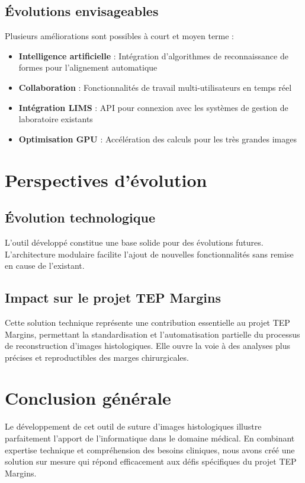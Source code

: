 \documentclass[11pt,a4paper]{report}
\begin{document}
\subsection{Évolutions envisageables}

Plusieurs améliorations sont possibles à court et moyen terme :

\begin{itemize}
\item \textbf{Intelligence artificielle} : Intégration d'algorithmes de reconnaissance de formes pour l'alignement automatique
\item \textbf{Collaboration} : Fonctionnalités de travail multi-utilisateurs en temps réel
\item \textbf{Intégration LIMS} : API pour connexion avec les systèmes de gestion de laboratoire existants
\item \textbf{Optimisation GPU} : Accélération des calculs pour les très grandes images
\end{itemize}

\section{Perspectives d'évolution}

\subsection{Évolution technologique}

L'outil développé constitue une base solide pour des évolutions futures. L'architecture modulaire facilite l'ajout de nouvelles fonctionnalités sans remise en cause de l'existant.

\subsection{Impact sur le projet TEP Margins}

Cette solution technique représente une contribution essentielle au projet TEP Margins, permettant la standardisation et l'automatisation partielle du processus de reconstruction d'images histologiques. Elle ouvre la voie à des analyses plus précises et reproductibles des marges chirurgicales.

\section{Conclusion générale}

Le développement de cet outil de suture d'images histologiques illustre parfaitement l'apport de l'informatique dans le domaine médical. En combinant expertise technique et compréhension des besoins cliniques, nous avons créé une solution sur mesure qui répond efficacement aux défis spécifiques du projet TEP Margins.
\end{document}
